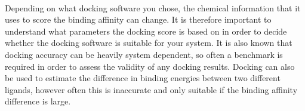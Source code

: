     \paragraph{}
        Depending on what docking software you chose, the chemical information that it uses to score the binding affinity can change. It is therefore important to understand what parameters the docking score is based on in order to decide whether the docking software is suitable for your system. It is also known that docking accuracy can be heavily system dependent, so often a benchmark is required in order to assess the validity of any docking results. Docking can also be used to estimate the difference in binding energies between two different ligands, however often this is inaccurate and only suitable if the binding affinity difference is large.

        